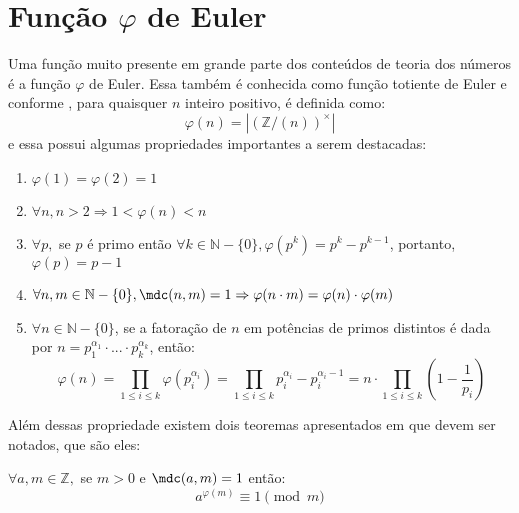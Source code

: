 \section{Função $\varphi$ de Euler}
Uma função muito presente em grande parte dos conteúdos de teoria dos números é a função $\varphi$ de Euler. Essa também é conhecida como função totiente de Euler e conforme \cite{book:2399854}, para quaisquer $n$ inteiro positivo, é definida como:
\begin{equation} \label{def:phi}
    \varphi(n) = |(\mathbb{Z}/(n))^{\times}|
\end{equation}
e essa possui algumas propriedades importantes a serem destacadas:
\begin{enumerate}
    \item $\varphi(1) = \varphi(2) = 1$
    \item \label{item:prop-phi-2} $\forall n, n > 2 \Rightarrow 1 < \varphi(n) < n$
    \item \label{item:prop-phi-3} $\forall p,$ se $p$ é primo então $\forall k \in \mathbb{N} - \{0\}, \varphi(p^k) = p^k - p^{k-1}$, portanto, $\varphi(p) = p - 1$
    \item \label{item:prop-phi-4} $\forall n, m \in \mathbb{N} - \{0\}, \mdc(n, m) = 1 \Rightarrow \varphi(n \cdot m) = \varphi(n) \cdot \varphi(m) $
    \item \label{item:prop-phi-5} $\forall n \in \mathbb{N} - \{0\}$, se a fatoração de $n$ em potências de primos distintos é dada por $n = p_{1}^{\alpha_{1}} \cdot ... \cdot p_{k}^{\alpha_{k}}$, então:
    \begin{equation} \label{lema:phi-formula}
        \varphi(n) = \prod_{1 \leq i \leq k} \varphi(p_{i}^{\alpha_{i}}) = \prod_{1 \leq i \leq k} p_{i}^{\alpha_{i}} - p_{i}^{\alpha_{i} - 1} = n \cdot \prod_{1 \leq i \leq k} \left( 1 - \frac{1}{p_{i}} \right)
    \end{equation}
\end{enumerate}

Além dessas propriedade existem dois teoremas apresentados em \cite{book:2399854} que devem ser notados, que são eles:

\begin{teorema}
\label{eq : euler-fermat}
$\forall a, m \in \mathbb{Z},$ se  $ m > 0$  e $\mdc(a,m) = 1$ então:
    \begin{equation*}
        a^{\varphi(m)} \equiv 1 \pmod{m}
    \end{equation*}
\end{teorema}


